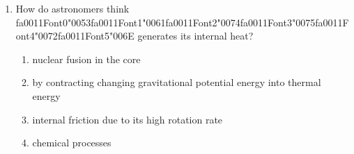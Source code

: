 \documentclass[12pt]{article}
\begin{document}
\begin{enumerate}[label=\arabic*.]
\begin{enumerate}[label=(\alph*)]
    \item Mass 5kg weight 25N
    \item Mass 10kg weight 100N
\end{enumerate}
\item How do astronomers think {\csname fa0011Font0\endcsname\char"0053}{\csname fa0011Font1\endcsname\char"0061}{\csname fa0011Font2\endcsname\char"0074}{\csname fa0011Font3\endcsname\char"0075}{\csname fa0011Font4\endcsname\char"0072}{\csname fa0011Font5\endcsname\char"006E} generates its internal heat?
\begin{enumerate}[label=(\alph*)]
    \item nuclear fusion in the core
    \item by contracting changing gravitational potential energy into thermal energy
    \item internal friction due to its high rotation rate
    \item chemical processes
\end{enumerate}
\end{enumerate}
\end{document}
